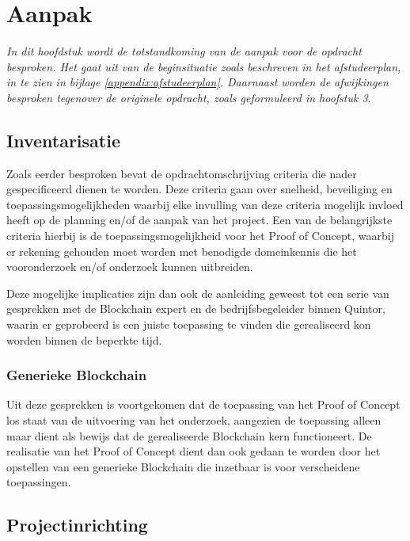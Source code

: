 \chapter{Aanpak}
\label{Aanpak}

\textit{In dit hoofdstuk wordt de totstandkoming van de aanpak voor de opdracht besproken. Het gaat uit van de beginsituatie zoals beschreven in het afstudeerplan, in te zien in bijlage \ref{appendix:afstudeerplan}. Daarnaast worden de afwijkingen besproken tegenover de originele opdracht, zoals geformuleerd in hoofstuk 3.}

\section{Inventarisatie}

Zoals eerder besproken bevat de opdrachtomschrijving criteria die nader gespecificeerd dienen te worden. Deze criteria gaan over snelheid, beveiliging en toepassingsmogelijkheden waarbij elke invulling van deze criteria mogelijk invloed heeft op de planning en/of de aanpak van het project. Een van de belangrijkste criteria hierbij is de toepassingsmogelijkheid voor het Proof of Concept, waarbij er rekening gehouden moet worden met benodigde domeinkennis die het vooronderzoek en/of onderzoek kunnen uitbreiden. 

Deze mogelijke implicaties zijn dan ook de aanleiding geweest tot een serie van gesprekken met de Blockchain expert en de bedrijfsbegeleider binnen Quintor, waarin er geprobeerd is een juiste toepassing te vinden die gerealiseerd kon worden binnen de beperkte tijd.

\subsection{Generieke Blockchain}

Uit deze gesprekken is voortgekomen dat de toepassing van het Proof of Concept los staat van de uitvoering van het onderzoek, aangezien de toepassing alleen maar dient als bewijs dat de gerealiseerde Blockchain kern functioneert. De realisatie van het Proof of Concept dient dan ook gedaan te worden door het opstellen van een generieke Blockchain die inzetbaar is voor verscheidene toepassingen. 

\newpage
\section{Projectinrichting}

